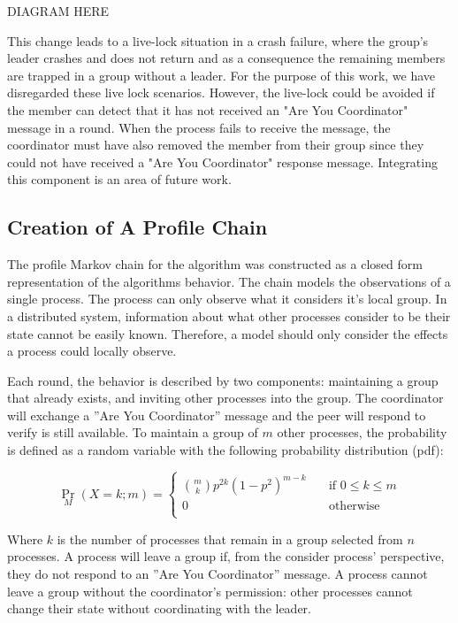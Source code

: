 DIAGRAM HERE

This change leads to a live-lock situation in a crash failure, where the group's leader crashes and does not return and as a consequence the remaining members are trapped in a group without a leader.
For the purpose of this work, we have disregarded these live lock scenarios.
However, the live-lock could be avoided if the member can detect that it has not received an "Are You Coordinator" message in a round.
When the process fails to receive the message, the coordinator must have also removed the member from their group since they could not have received a "Are You Coordinator" response message.
Integrating this component is an area of future work.

\subsection{Creation of A Profile Chain}

The profile Markov chain for the algorithm was constructed as a closed form representation of the algorithms behavior.
The chain models the observations of a single process.
The process can only observe what it considers it's local group.
In a distributed system, information about what other processes consider to be their state cannot be easily known.
Therefore, a model should only consider the effects a process could locally observe.

Each round, the behavior is described by two components: maintaining a group that already exists, and inviting other processes into the group.
The coordinator will exchange a ''Are You Coordinator'' message and the peer will respond to verify is still available.
To maintain a group of $m$ other processes, the probability is defined as a random variable with the following probability distribution (pdf):

\[
 \Pr_{M}(X=k; m) = 
 
   \begin{cases}
    \binom{m}{k} p^{2k}(1-p^2)^{m-k} & \quad \text{if } 0 \leq k \leq m \\
    0                                & \quad \text{otherwise} \\
  \end{cases}
\]

Where $k$ is the number of processes that remain in a group selected from $n$ processes.
A process will leave a group if, from the consider process' perspective, they do not respond to an ''Are You Coordinator'' message.
A process cannot leave a group without the coordinator's permission: other processes cannot change their state without coordinating with the leader.

